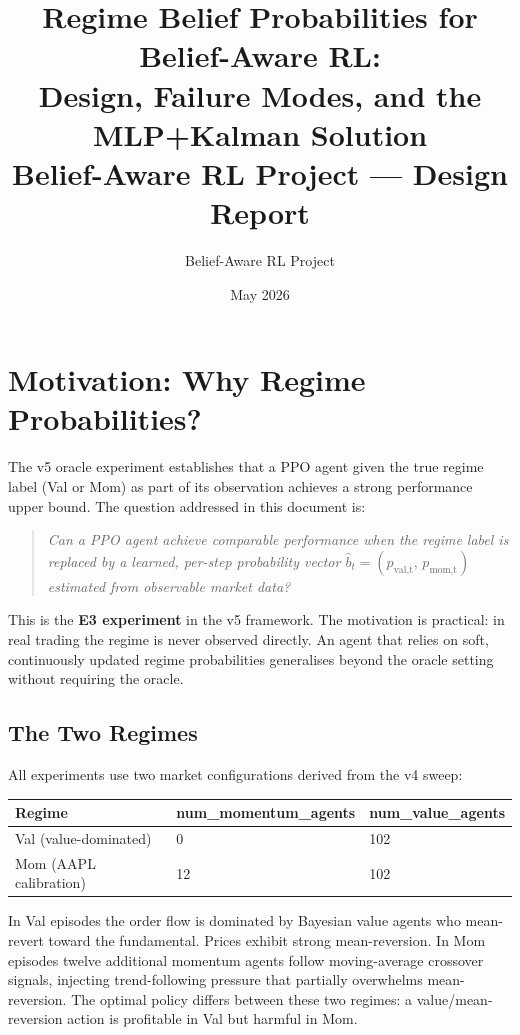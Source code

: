 \documentclass[11pt]{article}
\title{Regime Belief Probabilities for Belief-Aware RL:\\
       Design, Failure Modes, and the MLP+Kalman Solution\\[0.4em]
       \large Belief-Aware RL Project --- Design Report}
\author{Belief-Aware RL Project}
\date{May 2026}
\begin{document}
\maketitle
\tableofcontents
\bigskip

\section{Motivation: Why Regime Probabilities?}

The v5 oracle experiment establishes that a PPO agent given the true regime
label (Val or Mom) as part of its observation achieves a strong performance
upper bound.  The question addressed in this document is:

\begin{quote}
\emph{Can a PPO agent achieve comparable performance when the regime label is
replaced by a learned, per-step probability vector $\hat{b}_t = (p_\text{val,t},\,
p_\text{mom,t})$ estimated from observable market data?}
\end{quote}

This is the \textbf{E3 experiment} in the v5 framework.  The motivation is
practical: in real trading the regime is never observed directly.  An agent
that relies on soft, continuously updated regime probabilities generalises
beyond the oracle setting without requiring the oracle.

\subsection{The Two Regimes}

All experiments use two market configurations derived from the v4 sweep:

\begin{center}
\begin{tabular}{lll}
\toprule
\textbf{Regime} & \textbf{num\_momentum\_agents} & \textbf{num\_value\_agents} \\
\midrule
Val (value-dominated) & 0 & 102 \\
Mom (AAPL calibration) & 12 & 102 \\
\bottomrule
\end{tabular}
\end{center}

\noindent
In Val episodes the order flow is dominated by Bayesian value agents who
mean-revert toward the fundamental.  Prices exhibit strong mean-reversion.
In Mom episodes twelve additional momentum agents follow moving-average
crossover signals, injecting trend-following pressure that partially
overwhelms mean-reversion.  The optimal policy differs between these two
regimes: a value/mean-reversion action is profitable in Val but harmful in Mom.
\end{document}
